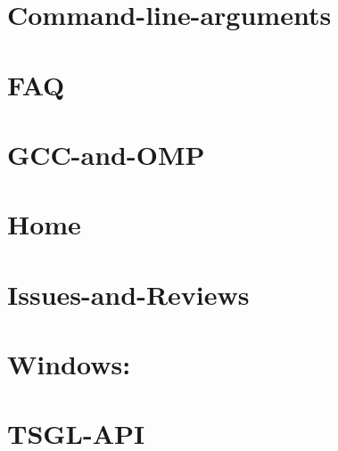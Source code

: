 \documentclass[twoside]{book}
\begin{document}
\chapter{Command-\/line-\/arguments}
\label{md__home_cpd5_workspace__t_s_g_l_docs-wiki__command-line-arguments}
\hypertarget{md__home_cpd5_workspace__t_s_g_l_docs-wiki__command-line-arguments}{}

\chapter{F\-A\-Q}
\label{md__home_cpd5_workspace__t_s_g_l_docs-wiki__f_a_q}
\hypertarget{md__home_cpd5_workspace__t_s_g_l_docs-wiki__f_a_q}{}

\chapter{G\-C\-C-\/and-\/\-O\-M\-P}
\label{md__home_cpd5_workspace__t_s_g_l_docs-wiki__g_c_c-and-_o_m_p}
\hypertarget{md__home_cpd5_workspace__t_s_g_l_docs-wiki__g_c_c-and-_o_m_p}{}

\chapter{Home}
\label{md__home_cpd5_workspace__t_s_g_l_docs-wiki__home}
\hypertarget{md__home_cpd5_workspace__t_s_g_l_docs-wiki__home}{}

\chapter{Issues-\/and-\/\-Reviews}
\label{md__home_cpd5_workspace__t_s_g_l_docs-wiki__issues-and-_reviews}
\hypertarget{md__home_cpd5_workspace__t_s_g_l_docs-wiki__issues-and-_reviews}{}

\chapter{Windows\-:}
\label{md__home_cpd5_workspace__t_s_g_l_docs-wiki__library-_versions}
\hypertarget{md__home_cpd5_workspace__t_s_g_l_docs-wiki__library-_versions}{}

\chapter{T\-S\-G\-L-\/\-A\-P\-I}
\label{md__home_cpd5_workspace__t_s_g_l_docs-wiki__t_s_g_l-_a_p_i}
\hypertarget{md__home_cpd5_workspace__t_s_g_l_docs-wiki__t_s_g_l-_a_p_i}{}

\end{document}
